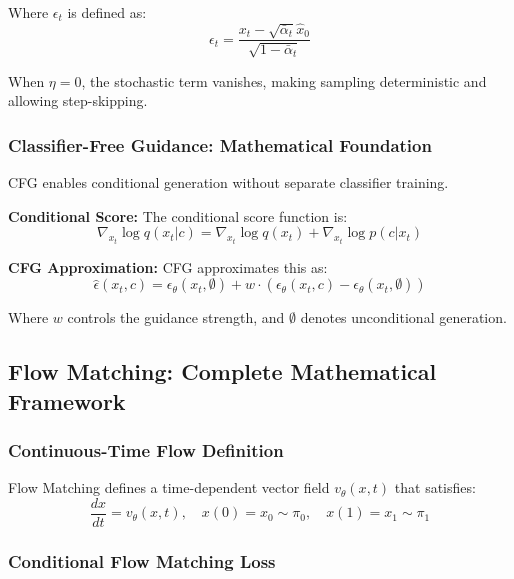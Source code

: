 \documentclass[a4paper,12pt]{article}
\begin{document}
Where $\epsilon_t$ is defined as:
\begin{equation}
\epsilon_t = \frac{x_t - \sqrt{\bar{\alpha}_t} \hat{x}_0}{\sqrt{1 - \bar{\alpha}_t}}
\label{eq:ddim_epsilon_t}
\end{equation}

When $\eta = 0$, the stochastic term vanishes, making sampling deterministic and allowing step-skipping.

\subsubsection{Classifier-Free Guidance: Mathematical Foundation}

CFG enables conditional generation without separate classifier training.

\textbf{Conditional Score:} The conditional score function is:
\begin{equation}
\nabla_{x_t} \log q(x_t | c) = \nabla_{x_t} \log q(x_t) + \nabla_{x_t} \log p(c | x_t)
\label{eq:conditional_score}
\end{equation}

\textbf{CFG Approximation:} CFG approximates this as:
\begin{equation}
\hat{\epsilon}(x_t, c) = \epsilon_\theta(x_t, \emptyset) + w \cdot (\epsilon_\theta(x_t, c) - \epsilon_\theta(x_t, \emptyset))
\label{eq:cfg_formula}
\end{equation}

Where $w$ controls the guidance strength, and $\emptyset$ denotes unconditional generation.

\subsection{Flow Matching: Complete Mathematical Framework}

\subsubsection{Continuous-Time Flow Definition}

Flow Matching defines a time-dependent vector field $v_\theta(x, t)$ that satisfies:
\begin{equation}
\frac{dx}{dt} = v_\theta(x, t), \quad x(0) = x_0 \sim \pi_0, \quad x(1) = x_1 \sim \pi_1
\label{eq:flow_ode}
\end{equation}

\subsubsection{Conditional Flow Matching Loss}
\end{document}
